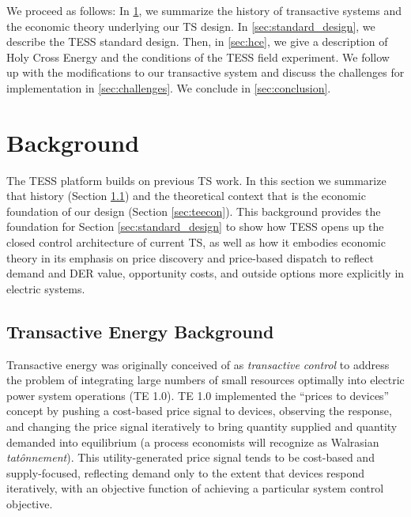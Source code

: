 \documentclass[12pt]{article}{Definitions/mdpi}
\begin{document}
We proceed as follows: In \cref{sec:background}, we summarize the history of transactive systems and the economic theory underlying our TS design. In \cref{sec:standard_design}, we describe the TESS standard design. Then, in \cref{sec:hce}, we give a description of Holy Cross Energy and the conditions of the TESS field experiment. We follow up with the modifications to our transactive system and discuss the challenges for implementation in \cref{sec:challenges}. We conclude in \cref{sec:conclusion}.



\section{Background}\label{sec:background}

The TESS platform builds on previous TS work. In this section we summarize that history (Section \ref{sec:tehistory}) and the theoretical context that is the economic foundation of our design (Section \ref{sec:teecon}).
This background provides the foundation for Section \ref{sec:standard_design} to show how TESS opens up the closed control architecture of current TS, as well as how it embodies economic theory in its emphasis on price discovery and price-based dispatch to reflect demand and DER value, opportunity costs, and outside options more explicitly in electric systems.

\subsection{Transactive Energy Background}\label{sec:tehistory} 

Transactive energy was originally conceived of as \emph{transactive control} to address the problem of integrating large numbers of small resources optimally into electric power system operations (TE 1.0).
TE 1.0 implemented the ``prices to devices'' concept by pushing a cost-based price signal to devices, observing the response, and changing the price signal iteratively to bring quantity supplied and quantity demanded into equilibrium (a process economists will recognize as Walrasian \emph{tat\^{o}nnement}). This utility-generated price signal tends to be cost-based and supply-focused, reflecting demand only to the extent that devices respond iteratively, with an objective function of achieving a particular system control objective.
\end{document}
